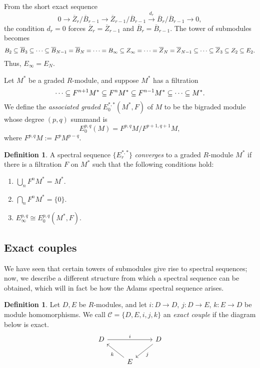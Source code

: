 \documentclass[11pt, titlepage]{article} %
\def\subq{\ensuremath\subseteq}
\numberwithin{equation}{subsection}
\theoremstyle{plain}
\theoremstyle{definition}
\newtheorem{definition}[theorem]{Definition}
\begin{document}
From the short exact sequence 
\[0 \to \overline Z_{r}/\overline B_{r-1}\to \overline Z_{r-1}/\overline B_{r-1} \xrightarrow{d_{r}} \overline B_{r}/\overline{B}_{r-1}\to 0,\]
the condition \(d_r=0\) forces  \(\overline{Z}_r=\overline{Z}_{r-1}\) and \(\overline{B}_r=\overline{B}_{r-1}\). The tower of submodules becomes
\[B_2\subq \overline B_3\subq \cdots \subq \overline B_{N-1}=\overline B_N= \cdots=B_\infty \subq Z_\infty= \cdots = \overline Z_N=\overline Z_{N-1}\subq \cdots \subq \overline Z_3\subq Z_2\subq E_2.\]
Thus, \(E_\infty=E_N\). 

Let \(M^*\) be a graded \(R\)-module, and suppose \(M^*\) has a filtration
\[\cdots \subq F^{n+1}M^*\subq F^nM^* \subq F^{n-1}M^*\subq \cdots \subq M^*.\]
We define the \textit{associated graded} \(E^{*,*}_0(M^*, F)\) of \(M\) to be the bigraded module whose degree \((p,q)\) summand is
\[E^{p,q}_0(M)= F^{p,q}M/F^{p+1,q+1}M,\]
where \(F^{p,q}M:=F^pM^{p-q}\). 

\begin{definition}\label{2504291808}
A spectral sequence \(\{E_r^{*,*}\}\) \textit{converges} to a graded \(R\)-module \(M^*\) if there is a filtration \(F\) on \(M^*\) such that the following conditions hold:
\begin{enumerate}
\item \(\bigcup_n F^nM^* = M^*\).
\item \(\bigcap_n F^nM^*=\{0\}\).
\item \(E_\infty^{p,q}\cong E^{p,q}_0(M^*, F)\).
\end{enumerate}
\end{definition}

\subsection{Exact couples}\label{2503301333}

We have seen that certain towers of submodules give rise to spectral sequences; now, we describe a different structure from which a spectral sequence can be obtained, which will in fact be how the Adams spectral sequence arises.

\begin{definition}
Let \(D, E\) be \(R\)-modules, and let \(i : D \to D\), \(j : D\to E\), \(k : E \to D\) be module homomorphisms. We call \(\mathcal{C}=\{D, E, i, j, k\}\) an \textit{exact couple} if the diagram below is exact.
\[\begin{tikzcd}
 D \arrow[rr, "i"] && D \arrow[dl, "j"] \\ 
  & E \arrow[ul, "k"] &  
 \end{tikzcd}\] 
\end{definition}
\end{document}
